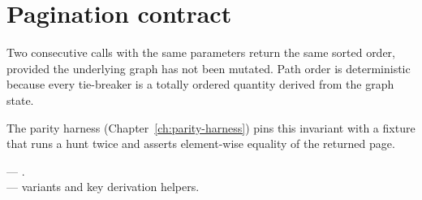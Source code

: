 \section{Pagination contract}

\begin{invariant}
Two consecutive  calls with the same
parameters return the same sorted order, provided the underlying
graph has not been mutated. Path order is deterministic because
every tie-breaker is a totally ordered quantity derived from the
graph state.
\end{invariant}

The parity harness (Chapter~\ref{ch:parity-harness}) pins this
invariant with a fixture that runs a hunt twice and asserts
element-wise equality of the returned page.

\begin{inthecode}
 ---
.\\
 --- 
variants and key derivation helpers.
\end{inthecode}
